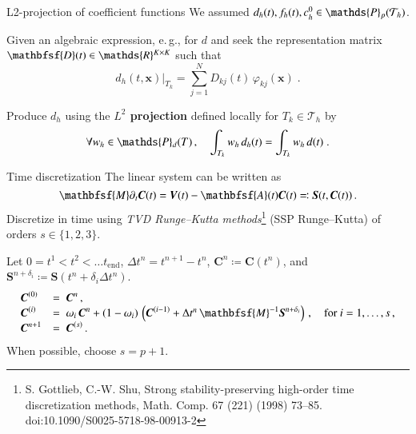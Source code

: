\documentclass[final,12pt]{beamer}
\newcommand{\IP}{\ensuremath\mathds{P}}
\newcommand{\IR}{\ensuremath\mathds{R}}
\newcommand*{\setT}{\ensuremath{\mathcal{T}}}                    %
\newcommand*{\vphi}{\varphi}                                     %
\renewcommand*{\vec}[1]{{\boldsymbol{#1}}}                       %
\newcommand*{\vecc}[1]{\mathbfsf{#1}}                            %
\begin{document}
\begin{frame}{L2-projection of coefficient functions}
  We assumed $d_h(t), f_h(t), c_h^0 \in \IP_p(\setT_h)$.

  Given an algebraic expression, e.\,g., for $d$ and seek the representation matrix $\vecc{D}(t) \in \IR^{K\times K}$ such that
  \begin{equation*}
    d_h(t,\vec{x})\big|_{T_k} = \sum_{j=1}^N D_{kj}(t)\, \vphi_{kj}(\vec{x})\;.
  \end{equation*}

  Produce $d_h$ using the \textbf{$L^2$ projection} defined locally for $T_k \in \setT_h$ by
  \begin{equation*}
    \forall w_h \in \IP_d(T)\,, \quad \int_{T_k} w_h\, d_h(t) = \int_{T_k} w_h\, d(t)\;.
  \end{equation*}
\end{frame}

\begin{frame}{Time discretization}
  The linear system can be written as
  \begin{equation*}
    \vecc{M}\partial_t \vec{C}(t) = \vec{V}(t) - \vecc{A}(t) \vec{C}(t) \eqqcolon \vec{S}(t, \vec{C}(t))\,.
  \end{equation*}
  Discretize in time using \emph{TVD Runge--Kutta methods}\footnote{S. Gottlieb, C.-W. Shu, Strong stability-preserving high-order time discretization methods, Math. Comp. 67 (221) (1998) 73–85. doi:10.1090/S0025-5718-98-00913-2} (SSP Runge--Kutta) of orders \emph{$s \in \{1,2,3\}$}.
  \par
  Let $0 = t^1 < t^2 < \ldots t_\mathrm{end}$, $\Delta t^n = t^{n+1} - t^n$,
  $\vec{C}^n \coloneqq \vec{C}(t^n)$, and
  $\vec{S}^{n+\delta_i} \coloneqq \vec{S}(t^n+\delta_i\Delta t^n)$.
  \begin{equation*}
    \begin{array}{lll}
    \vec{C}^{(0)} &=\; \vec{C}^{n} \,, \\
    \vec{C}^{(i)} &=\; \omega_i\,\vec{C}^{n} + (1-\omega_i)\,\left( \vec{C}^{(i-1)}
    + \Delta t^n\,\vecc{M}^{-1} \vec{S}^{n + \delta_i} \right) \,, \quad \text{for}~i = 1,\ldots,s\,,\\
    \vec{C}^{n+1} &=\; \vec{C}^{(s)} \,.
    \end{array}
  \end{equation*}
  When possible, choose $s = p+1$.
\end{frame}
\end{document}
